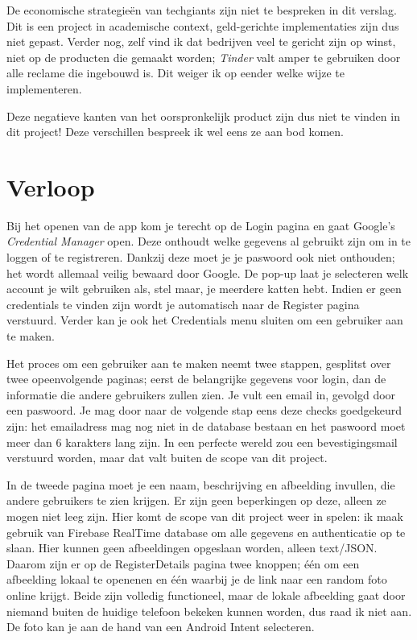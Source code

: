 \documentclass{report}
\begin{document}
De economische strategieën van techgiants zijn niet te bespreken in dit verslag. Dit is een project in academische context, geld-gerichte implementaties zijn dus niet gepast.
Verder nog, zelf vind ik dat bedrijven veel te gericht zijn op winst, niet op de producten die gemaakt worden; \textit{Tinder} valt amper te gebruiken door alle reclame die ingebouwd is.
Dit weiger ik op eender welke wijze te implementeren.

Deze negatieve kanten van het oorspronkelijk product zijn dus niet te vinden in dit project! Deze verschillen bespreek ik wel eens ze aan bod komen.


\chapter{Verloop}

Bij het openen van de app kom je terecht op de Login pagina en gaat Google's \textit{Credential Manager} open. Deze onthoudt welke gegevens al gebruikt zijn om in te loggen of te registreren.
Dankzij deze moet je je paswoord ook niet onthouden; het wordt allemaal veilig bewaard door Google.
De pop-up laat je selecteren welk account je wilt gebruiken als, stel maar, je meerdere katten hebt. Indien er geen credentials te vinden zijn wordt je automatisch naar de Register pagina verstuurd.
Verder kan je ook het Credentials menu sluiten om een gebruiker aan te maken.

Het proces om een gebruiker aan te maken neemt twee stappen, gesplitst over twee opeenvolgende paginas; eerst de belangrijke gegevens voor login, dan de informatie die andere gebruikers zullen zien.
Je vult een email in, gevolgd door een paswoord. Je mag door naar de volgende stap eens deze checks goedgekeurd zijn: het emailadress mag nog niet in de database bestaan en het paswoord moet meer dan 6 karakters lang zijn.
In een perfecte wereld zou een bevestigingsmail verstuurd worden, maar dat valt buiten de scope van dit project.

In de tweede pagina moet je een naam, beschrijving en afbeelding invullen, die andere gebruikers te zien krijgen. Er zijn geen beperkingen op deze, alleen ze mogen niet leeg zijn.
Hier komt de scope van dit project weer in spelen: ik maak gebruik van Firebase RealTime database om alle gegevens en authenticatie op te slaan. Hier kunnen geen afbeeldingen opgeslaan worden, alleen text/JSON.
Daarom zijn er op de RegisterDetails pagina twee knoppen; één om een afbeelding lokaal te openenen en één waarbij je de link naar een random foto online krijgt. 
Beide zijn volledig functioneel, maar de lokale afbeelding gaat door niemand buiten de huidige telefoon bekeken kunnen worden, dus raad ik niet aan.
De foto kan je aan de hand van een Android Intent selecteren.
\end{document}
